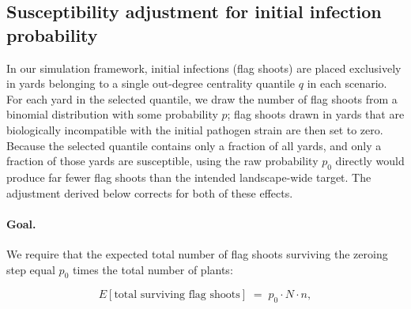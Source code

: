 \documentclass[10pt,a4paper]{article}
\begin{document}
\newpage

\subsection{Susceptibility adjustment for initial infection probability}\label{sec:susceptibility_adjustment}

%
%
%

In our simulation framework, initial infections (flag shoots) are placed exclusively in yards belonging to a single out-degree centrality quantile $q$ in each scenario. For each yard in the selected quantile, we draw the number of flag shoots from a binomial distribution with some probability $p$; flag shoots drawn in yards that are biologically incompatible with the initial pathogen strain are then set to zero. Because the selected quantile contains only a fraction of all yards, and only a fraction of those yards are susceptible, using the raw probability $p_0$ directly would produce far fewer flag shoots than the intended landscape-wide target. The adjustment derived below corrects for both of these effects.

\paragraph{Goal.} We require that the expected total number of flag shoots surviving the zeroing step equal $p_0$ times the total number of plants:

$$E[\text{total surviving flag shoots}] \;=\; p_0 \cdot N \cdot n,$$
\end{document}
